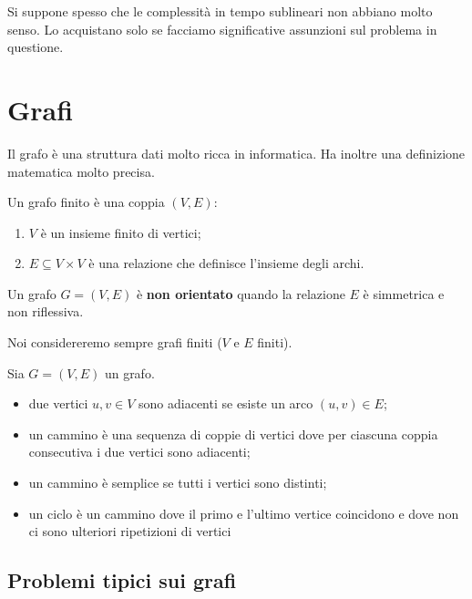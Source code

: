 Si suppone spesso che le complessità in tempo sublineari non abbiano molto senso. Lo acquistano
solo se facciamo significative assunzioni sul problema in questione.

\section{Grafi}

Il grafo è una struttura dati molto ricca in informatica. Ha inoltre una definizione matematica
molto precisa.

\begin{defn}
    Un grafo finito è una coppia $(V,E)$:
    \begin{enumerate}
        \item $V$ è un insieme finito di vertici;
        \item $E \subseteq V \times V$ è una relazione che definisce l'insieme degli archi.
    \end{enumerate}
\end{defn}

Un grafo $G = (V,E)$ è \textbf{non orientato} quando la relazione $E$ è simmetrica e non
riflessiva.

Noi considereremo sempre grafi finiti ($V$ e $E$ finiti).

\begin{defn}
    Sia $G = (V,E)$ un grafo.
    \begin{itemize}
        \item due vertici $u,v \in V$ sono adiacenti se esiste un arco $(u,v) \in E$;
        \item un cammino è una sequenza di coppie di vertici dove per ciascuna coppia consecutiva
        i due vertici sono adiacenti;
        \item un cammino è semplice se tutti i vertici sono distinti;
        \item un ciclo è un cammino dove il primo e l'ultimo vertice coincidono e dove non ci sono
        ulteriori ripetizioni di vertici
    \end{itemize}
\end{defn}

\subsection{Problemi tipici sui grafi}

